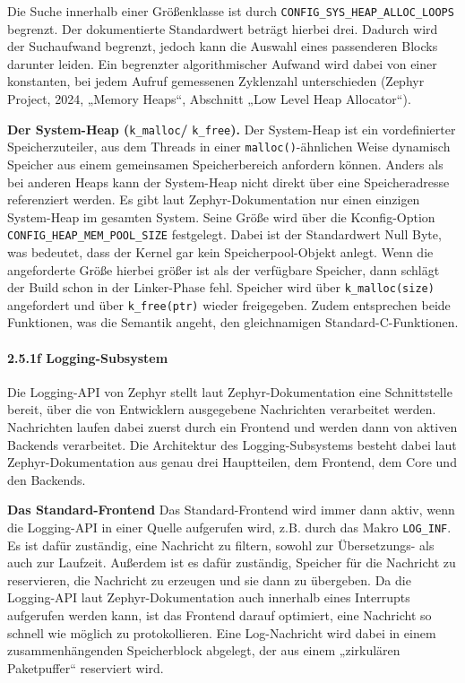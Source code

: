 Die Suche innerhalb einer Größenklasse ist durch \lstinline[style=fileinline]|CONFIG_SYS_HEAP_ALLOC_LOOPS| begrenzt. Der dokumentierte Standardwert beträgt hierbei drei. Dadurch wird der Suchaufwand begrenzt, jedoch kann die Auswahl eines passenderen Blocks darunter leiden. Ein begrenzter algorithmischer Aufwand wird dabei von einer konstanten, bei jedem Aufruf gemessenen Zyklenzahl unterschieden (Zephyr Project, 2024, „Memory Heaps“, Abschnitt „Low Level Heap Allocator“).

\textbf{Der System-Heap (}\lstinline[style=fileinline]|k_malloc|\textbf{/ }\lstinline[style=fileinline]|k_free|\textbf{).} Der System-Heap ist ein vordefinierter Speicherzuteiler, aus dem Threads in einer \lstinline[style=fileinline]|malloc()|-ähnlichen Weise dynamisch Speicher aus einem gemeinsamen Speicherbereich anfordern können. Anders als bei anderen Heaps kann der System-Heap nicht direkt über eine Speicheradresse referenziert werden. Es gibt laut Zephyr-Dokumentation nur einen einzigen System-Heap im gesamten System. Seine Größe wird über die Kconfig-Option \lstinline[style=fileinline]|CONFIG_HEAP_MEM_POOL_SIZE| festgelegt. Dabei ist der Standardwert Null Byte, was bedeutet, dass der Kernel gar kein Speicherpool-Objekt anlegt. Wenn die angeforderte Größe hierbei größer ist als der verfügbare Speicher, dann schlägt der Build schon in der Linker-Phase fehl. Speicher wird über \lstinline[style=fileinline]|k_malloc(size)| angefordert und über \lstinline[style=fileinline]|k_free(ptr)| wieder freigegeben. Zudem entsprechen beide Funktionen, was die Semantik angeht, den gleichnamigen Standard-C-Funktionen.

\paragraph*{\textbf{2.5.1f Logging-Subsystem}}
Die Logging-API von Zephyr stellt laut Zephyr-Dokumentation eine Schnittstelle bereit, über die von Entwicklern ausgegebene Nachrichten verarbeitet werden. Nachrichten laufen dabei zuerst durch ein Frontend und werden dann von aktiven Backends verarbeitet. Die Architektur des Logging-Subsystems besteht dabei laut Zephyr-Dokumentation aus genau drei Hauptteilen, dem Frontend, dem Core und den Backends.

\textbf{Das Standard-Frontend} Das Standard-Frontend wird immer dann aktiv, wenn die Logging-API in einer Quelle aufgerufen wird, z.B. durch das Makro \lstinline[style=fileinline]|LOG_INF|. Es ist dafür zuständig, eine Nachricht zu filtern, sowohl zur Übersetzungs- als auch zur Laufzeit. Außerdem ist es dafür zuständig, Speicher für die Nachricht zu reservieren, die Nachricht zu erzeugen und sie dann zu übergeben. Da die Logging-API laut Zephyr-Dokumentation auch innerhalb eines Interrupts aufgerufen werden kann, ist das Frontend darauf optimiert, eine Nachricht so schnell wie möglich zu protokollieren. Eine Log-Nachricht wird dabei in einem zusammenhängenden Speicherblock abgelegt, der aus einem „zirkulären Paketpuffer“ reserviert wird.

